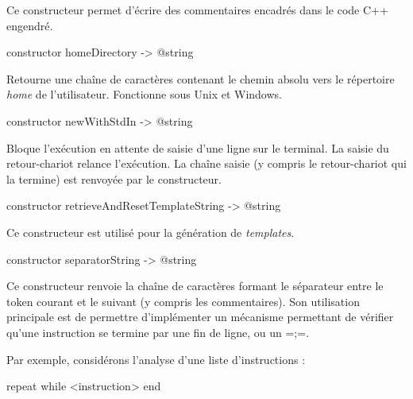 Ce constructeur permet d'écrire des commentaires encadrés dans le code C++ engendré.





\begin{galgas3box}
constructor homeDirectory -> @string
\end{galgas3box}

Retourne une chaîne de caractères contenant le chemin absolu vers le répertoire \emph{home} de l'utilisateur. Fonctionne sous Unix et Windows.





\begin{galgas3box}
constructor newWithStdIn -> @string
\end{galgas3box}

Bloque l'exécution en attente de saisie d'une ligne sur le terminal. La saisie du retour-chariot relance l'exécution. La chaîne saisie (y compris le retour-chariot qui la termine) est renvoyée par le constructeur.







\begin{galgas3box}
constructor retrieveAndResetTemplateString -> @string
\end{galgas3box}

Ce constructeur est utilisé pour la génération de \emph{templates}.







\begin{galgas3box}
constructor separatorString -> @string
\end{galgas3box}

Ce constructeur renvoie la chaîne de caractères formant le séparateur entre le token courant et le suivant (y compris les commentaires). Son utilisation principale est de permettre d'implémenter un mécanisme permettant de vérifier qu'une instruction se termine par une fin de ligne, ou un \ggst=;=.

Par exemple, considérons l'analyse d'une liste d'instructions :

\begin{galgas3}
repeat
while
  <instruction>
end
\end{galgas3}

